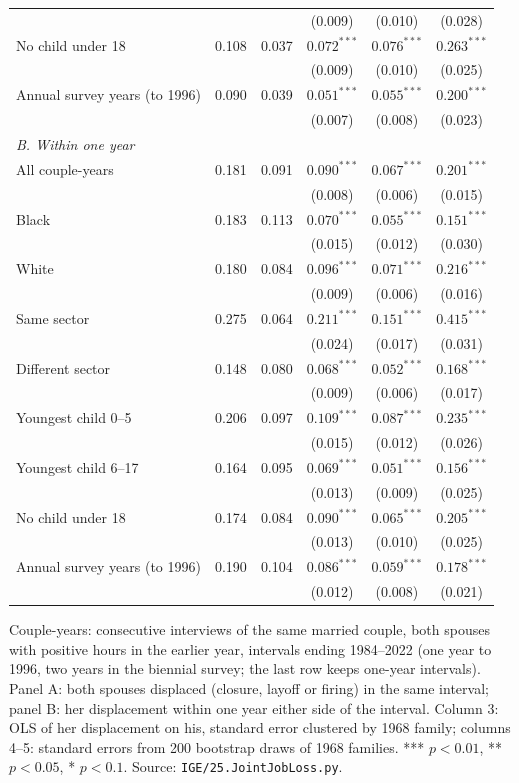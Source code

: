 \begin{table}[htbp]
{\begin{tabular}{lccccc}
 & & & (0.009) & (0.010) & (0.028) \\
No child under 18 & 0.108 & 0.037 & $0.072^{***}$ & $0.076^{***}$ & $0.263^{***}$ \\
 & & & (0.009) & (0.010) & (0.025) \\
Annual survey years (to 1996) & 0.090 & 0.039 & $0.051^{***}$ & $0.055^{***}$ & $0.200^{***}$ \\
 & & & (0.007) & (0.008) & (0.023) \\
\multicolumn{6}{l}{\textit{B. Within one year}} \\
All couple-years & 0.181 & 0.091 & $0.090^{***}$ & $0.067^{***}$ & $0.201^{***}$ \\
 & & & (0.008) & (0.006) & (0.015) \\
Black & 0.183 & 0.113 & $0.070^{***}$ & $0.055^{***}$ & $0.151^{***}$ \\
 & & & (0.015) & (0.012) & (0.030) \\
White & 0.180 & 0.084 & $0.096^{***}$ & $0.071^{***}$ & $0.216^{***}$ \\
 & & & (0.009) & (0.006) & (0.016) \\
Same sector & 0.275 & 0.064 & $0.211^{***}$ & $0.151^{***}$ & $0.415^{***}$ \\
 & & & (0.024) & (0.017) & (0.031) \\
Different sector & 0.148 & 0.080 & $0.068^{***}$ & $0.052^{***}$ & $0.168^{***}$ \\
 & & & (0.009) & (0.006) & (0.017) \\
Youngest child 0--5 & 0.206 & 0.097 & $0.109^{***}$ & $0.087^{***}$ & $0.235^{***}$ \\
 & & & (0.015) & (0.012) & (0.026) \\
Youngest child 6--17 & 0.164 & 0.095 & $0.069^{***}$ & $0.051^{***}$ & $0.156^{***}$ \\
 & & & (0.013) & (0.009) & (0.025) \\
No child under 18 & 0.174 & 0.084 & $0.090^{***}$ & $0.065^{***}$ & $0.205^{***}$ \\
 & & & (0.013) & (0.010) & (0.025) \\
Annual survey years (to 1996) & 0.190 & 0.104 & $0.086^{***}$ & $0.059^{***}$ & $0.178^{***}$ \\
 & & & (0.012) & (0.008) & (0.021) \\
\bottomrule
\end{tabular}}
\begin{minipage}{0.95\textwidth}\footnotesize Couple-years: consecutive interviews of the same married couple, both spouses with positive hours in the earlier year, intervals ending 1984--2022 (one year to 1996, two years in the biennial survey; the last row keeps one-year intervals). Panel A: both spouses displaced (closure, layoff or firing) in the same interval; panel B: her displacement within one year either side of the interval. Column 3: OLS of her displacement on his, standard error clustered by 1968 family; columns 4--5: standard errors from 200 bootstrap draws of 1968 families. *** $p<0.01$, ** $p<0.05$, * $p<0.1$. Source: \texttt{IGE/25.JointJobLoss.py}.\end{minipage}
\end{table}
